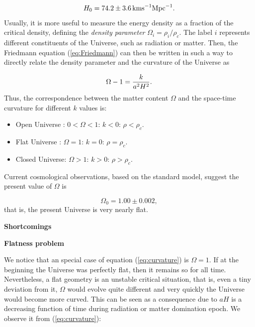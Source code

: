 \documentclass{rmaa}
\def\beq{\begin{equation}}
\def\eeq{\end{equation}}
\begin{document}
\beq
 H_0= 74.2 \pm 3.6 \, {\rm km s}^{-1} {\rm Mpc}^{-1}.
\eeq
%
Usually, it is more useful to measure the energy density as a fraction of the critical density,
defining the \textit{density parameter} $\Omega_i= \rho_i / \rho_c$. The label $i$ represents
different constituents of the Universe, such as radiation or matter. 
Then, the Friedmann equation (\ref{eq:Friedmann}) can then be written in such a way to
directly relate the density parameter and the curvature of the Universe as

\begin{equation} \label{eq:curvature}
 \Omega -1={k \over a^2H^2}.
\end{equation}
%
Thus, the correspondence between the matter content $\Omega$ and the space-time 
curvature for different $k$ values is: 
\begin{itemize}
\item Open Universe : $0<\Omega<1: \, k<0: \, \rho<\rho_c$. 
\item Flat Universe       : $\Omega=1: \, k=0: \, \rho=\rho_c$. 
\item Closed Universe: $\Omega>1: \, k>0: \, \rho>\rho_c$.
\end{itemize}

   
\noindent
Current cosmological observations, based on the standard model, suggest the present value of 
$\Omega$ is \citep{Komat}

\beq \label{eq:Omega}
\Omega_0=1.00\pm 0.002,
\eeq
%
that is, the present Universe is very nearly flat.
\\


\begin{center}
\textbf{\large Shortcomings}
\end{center}

\vskip 10pt

\textbf{Flatness problem}
\vskip 10pt


We notice that an special case of equation (\ref{eq:curvature}) is $\Omega=1$. 
If at the beginning the Universe was 
perfectly flat,  then it remains so for all time. Nevertheless, a flat geometry is an unstable
critical situation, that is, even a tiny deviation from it, $\Omega$ would evolve 
quite different and very quickly the Universe would become more curved. 
This can be seen as a consequence due to $aH$ is a decreasing function of time 
during radiation or matter domination epoch.
We observe it from (\ref{eq:curvature}):
%
\end{document}
